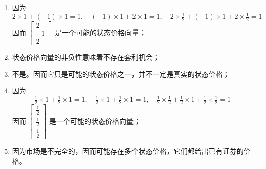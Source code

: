 \begin{solution}
\begin{enumerate}[label=(\alph*)]
    \item 因为
    \[
        2\times 1+(-1)\times 1=1,\quad (-1)\times 1+2\times 1=1,\quad 2\times\tfrac12+(-1)\times 1+2\times\tfrac12=1
    \]
    因而 $\begin{bmatrix}2 \\ -1 \\ 2\end{bmatrix}$ 是一个可能的状态价格向量；
    \item 状态价格向量的非负性意味着不存在套利机会；
    \item 不是。因而它只是可能的状态价格之一，并不一定是真实的状态价格；
    \item 因为
    \[
        \tfrac12\times 1+\tfrac12\times 1=1,\quad \tfrac12\times 1+\tfrac12\times 1=1,\quad \tfrac12\times\tfrac12+\tfrac12\times 1+\tfrac12\times\tfrac12=1
    \]
    因而 $\begin{bmatrix}\tfrac12 \\ \tfrac12 \\ \tfrac12\end{bmatrix}$ 是一个可能的状态价格向量；
    \item 因为市场是不完全的，因而可能存在多个状态价格，它们都给出已有证券的价格。
\end{enumerate}
\end{solution}


